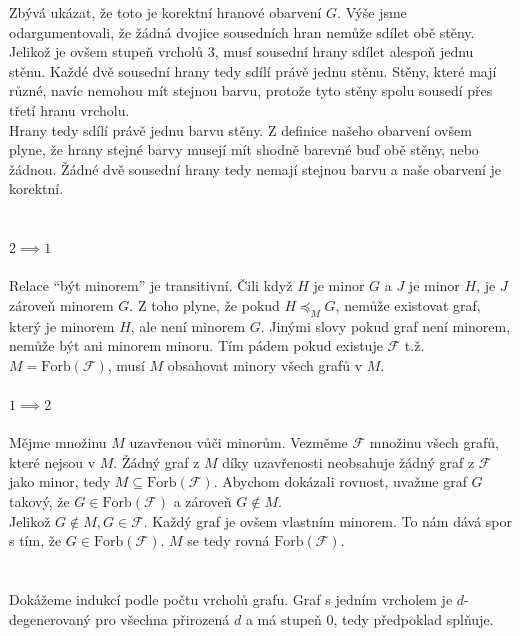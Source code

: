 \documentclass{scrartcl}
\begin{document}
    Zbývá ukázat, že toto je korektní hranové obarvení $G$. Výše jsme odargumentovali, že žádná dvojice sousedních hran nemůže sdílet obě stěny. Jelikož je ovšem stupeň vrcholů 3, musí sousední hrany sdílet alespoň jednu stěnu. Každé dvě sousední hrany tedy sdílí právě jednu stěnu. Stěny, které mají různé, navíc nemohou mít stejnou barvu, protože tyto stěny spolu sousedí přes třetí hranu vrcholu. \\

    Hrany tedy sdílí právě jednu barvu stěny. Z definice našeho obarvení ovšem plyne, že hrany stejné barvy musejí mít shodně barevné buď obě stěny, nebo žádnou. Žádné dvě sousední hrany tedy nemají stejnou barvu a naše obarvení je korektní.
    
    \section{}
    \paragraph{$2 \implies 1$}
    Relace ``být minorem'' je transitivní. Čili když $H$ je minor $G$ a $J$ je minor $H$, je $J$ zároveň minorem $G$. Z toho plyne, že pokud $H \preccurlyeq_M G$, nemůže existovat graf, který je minorem $H$, ale není minorem $G$. Jinými slovy pokud graf není minorem, nemůže být ani minorem minoru. Tím pádem pokud existuje $\mathcal{F}$ t.ž. $M = \text{Forb}(\mathcal{F})$, musí $M$ obsahovat minory všech grafů v $M$. 

    \paragraph{$1 \implies 2$}
    Mějme množinu $M$ uzavřenou vůči minorům. Vezměme $\mathcal{F}$ množinu všech grafů, které nejsou v $M$. Žádný graf z $M$ díky uzavřenosti neobsahuje žádný graf z $\mathcal{F}$ jako minor, tedy $M \subseteq \text{Forb}(\mathcal{F})$. Abychom dokázali rovnost, uvažme graf $G$ takový, že $G \in \text{Forb}(\mathcal{F})$ a zároveň $G \notin M$. \\

    Jelikož $G \notin M, G \in \mathcal{F}$. Každý graf je ovšem vlastním minorem. To nám dává spor s tím, že $G \in \text{Forb}(\mathcal{F})$. $M$ se tedy rovná $\text{Forb}(\mathcal{F})$.

    \section{}
    Dokážeme indukcí podle počtu vrcholů grafu. Graf s jedním vrcholem je $d$-degenerovaný pro všechna přirozená $d$ a má stupeň 0, tedy předpoklad splňuje. \\
\end{document}
